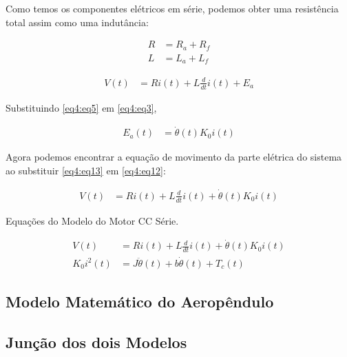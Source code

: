 Como temos os componentes elétricos em série, podemos obter uma resistência total assim como uma indutância:

\begin{align}
	R &= R_a + R_f          \label{eq4:eq10}\\        
	L &= L_a + L_f          \label{eq4:eq11}
\end{align}


\begin{align}
	V(t) &= Ri(t)+ L\frac{d}{dt}i(t) + E_a \label{eq4:eq12}
\end{align}

Substituindo \ref{eq4:eq5} em \ref{eq4:eq3},

\begin{align}
	E_a(t) &= \dot{\theta}(t)K_0 i(t) \label{eq4:eq13}
\end{align}

Agora podemos encontrar a equação de movimento da parte elétrica do sistema ao substituir \ref{eq4:eq13} em \ref{eq4:eq12}:

\begin{align}
	V(t) &= Ri(t)+ L\frac{d}{dt}i(t) + \dot{\theta}(t)K_0 i(t) \label{eq4:eq14}
\end{align}

Equações do Modelo do Motor CC Série.

\begin{align}
	V(t) &= Ri(t)+ L\frac{d}{dt}i(t) + \dot{\theta}(t)K_0 i(t) \label{eq4:eq15}\\
	K_0 i^2(t) &= J\ddot{\theta}(t) + b\dot{\theta}(t) + T_c(t) \label{eq4:eq16}
\end{align}



\subsection{ Modelo Matemático do Aeropêndulo}




\subsection{Junção dos dois Modelos}